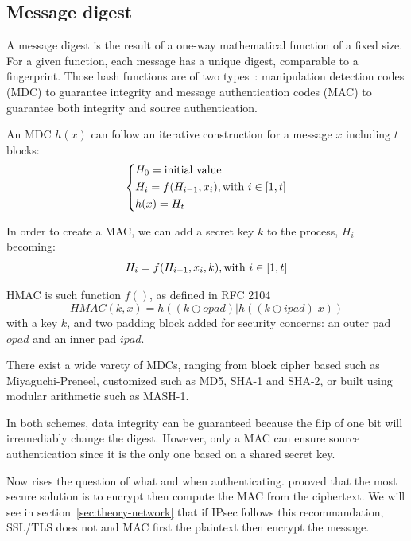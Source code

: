 \subsection{Message digest}
A message digest is the result of a one-way mathematical function of a fixed size.
For a given function, each message has a unique digest, comparable to a fingerprint.
Those hash functions are of two types~\cite{infof405}: manipulation detection codes (MDC) to guarantee integrity and message authentication codes (MAC) to guarantee both integrity and source authentication.


An MDC $h(x)$ can follow an iterative construction for a message $x$ including $t$ blocks:
\[
\begin{dcases}
	H_0 = \mbox{initial value}\\
	H_i = f(H_{i-1}, x_i), \mbox{with } i \in [1,t]\\
	h(x) = H_t\\
\end{dcases}
\]

In order to create a MAC, we can add a secret key $k$ to the process, $H_i$ becoming:
\[
	H_i = f(H_{i-1}, x_i, k), \mbox{with } i \in [1,t]\\
\]

HMAC is such function $f()$, as defined in RFC 2104~\cite{rfc2104}
\[
	HMAC(k, x) = h((k\oplus opad)|h((k\oplus ipad)|x))
\]
with a key $k$, and two padding block added for security concerns: an outer pad $opad$ and an inner pad $ipad$.

\noindent There exist a wide varety of MDCs, ranging from block cipher based such as Miyaguchi-Preneel, customized such as MD5, SHA-1 and SHA-2, or built using modular arithmetic such as MASH-1.

In both schemes, data integrity can be guaranteed because the flip of one bit will irremediably change the digest.
However, only a MAC can ensure source authentication since it is the only one based on a shared secret key.

Now rises the question of what and when authenticating.
\citet{Bellare2000} prooved that the most secure solution is to encrypt then compute the MAC from the ciphertext.
We will see in section~\ref{sec:theory-network} that if IPsec follows this recommandation, SSL/TLS does not and MAC first the plaintext then encrypt the message.











